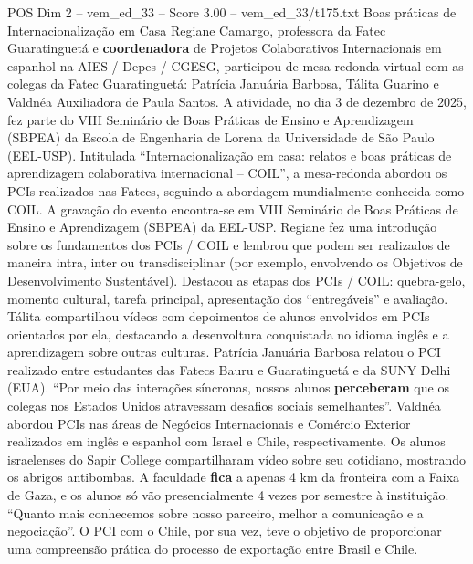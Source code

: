 \begin{textsample}{POS Dim 2 – vem\_ed\_33 – Score 3.00 – vem\_ed\_33/t175.txt}  \label{ex:f2_pos_143}
Boas práticas de Internacionalização em Casa Regiane Camargo, professora da Fatec Guaratinguetá e \textbf{coordenadora} de Projetos Colaborativos Internacionais em espanhol na AIES / Depes / CGESG, participou de mesa-redonda virtual com as colegas da Fatec Guaratinguetá: Patrícia Januária Barbosa, Tálita Guarino e Valdnéa Auxiliadora de Paula Santos.
A atividade, no dia 3 de dezembro de 2025, fez parte do VIII Seminário de Boas Práticas de Ensino e Aprendizagem (SBPEA) da Escola de Engenharia de Lorena da Universidade de São Paulo (EEL-USP).
Intitulada “Internacionalização em casa: relatos e boas práticas de aprendizagem colaborativa internacional – COIL”, a mesa-redonda abordou os PCIs realizados nas Fatecs, seguindo a abordagem mundialmente conhecida como COIL.
A gravação do evento encontra-se em VIII Seminário de Boas Práticas de Ensino e Aprendizagem (SBPEA) da EEL-USP.
Regiane fez uma introdução sobre os fundamentos dos PCIs / COIL e lembrou que podem ser realizados de maneira intra, inter ou transdisciplinar (por exemplo, envolvendo os Objetivos de Desenvolvimento Sustentável).
Destacou as etapas dos PCIs / COIL: quebra-gelo, momento cultural, tarefa principal, apresentação dos “entregáveis” e avaliação.
Tálita compartilhou vídeos com depoimentos de alunos envolvidos em PCIs orientados por ela, destacando a desenvoltura conquistada no idioma inglês e a aprendizagem sobre outras culturas.
Patrícia Januária Barbosa relatou o PCI realizado entre estudantes das Fatecs Bauru e Guaratinguetá e da SUNY Delhi (EUA). “Por meio das interações síncronas, nossos alunos \textbf{perceberam} que os colegas nos Estados Unidos atravessam desafios sociais semelhantes”.
Valdnéa abordou PCIs nas áreas de Negócios Internacionais e Comércio Exterior realizados em inglês e espanhol com Israel e Chile, respectivamente.
Os alunos israelenses do Sapir College compartilharam vídeo sobre seu cotidiano, mostrando os abrigos antibombas.
A faculdade \textbf{fica} a apenas 4 km da fronteira com a Faixa de Gaza, e os alunos só vão presencialmente 4 vezes por semestre à instituição. “Quanto mais conhecemos sobre nosso parceiro, melhor a comunicação e a negociação”.
O PCI com o Chile, por sua vez, teve o objetivo de proporcionar uma compreensão prática do processo de exportação entre Brasil e Chile.

\end{textsample}
